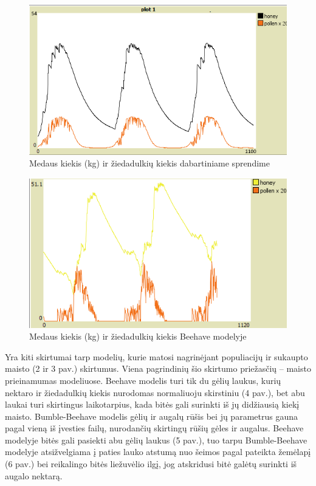 \documentclass{VUMIFKompMagistrinis}
\begin{document}
\begin{figure}[H]
    \centering
    \includegraphics[scale=0.75]{img/mtd3/mtdp3v11-img002.png}
    \caption{Medaus kiekis (kg) ir žiedadulkių kiekis dabartiniame sprendime}
    \label{img:m2}
\end{figure}

\begin{figure}[H]
    \centering
    \includegraphics[scale=0.75]{img/mtd3/mtdp3v11-img003.png}
    \caption{Medaus kiekis (kg) ir žiedadulkių kiekis Beehave modelyje}
    \label{img:m3}
\end{figure}


	 Yra kiti skirtumai tarp modelių, kurie matosi nagrinėjant populiacijų ir sukaupto maisto (2 ir 3 pav.) skirtumus. Viena pagrindinių šio skirtumo priežasčių – maisto prieinamumas modeliuose. Beehave modelis turi tik du gėlių laukus, kurių nektaro ir žiedadulkių kiekis nurodomas normaliuoju skirstiniu (4 pav.), bet abu laukai turi skirtingus laikotarpius, kada bitės gali surinkti iš jų didžiausią kiekį maisto. Bumble-Beehave modelis gėlių ir augalų rūšis bei jų parametrus gauna pagal vieną iš įvesties failų, nurodančių skirtingų rūšių gėles ir augalus. Beehave modelyje bitės gali pasiekti abu gėlių laukus (5 pav.), tuo tarpu Bumble-Beehave modelyje atsižvelgiama į paties lauko atstumą nuo šeimos pagal pateikta žemėlapį (6 pav.) bei reikalingo bitės liežuvėlio ilgį, jog atskridusi bitė galėtų surinkti iš augalo nektarą.
\end{document}
